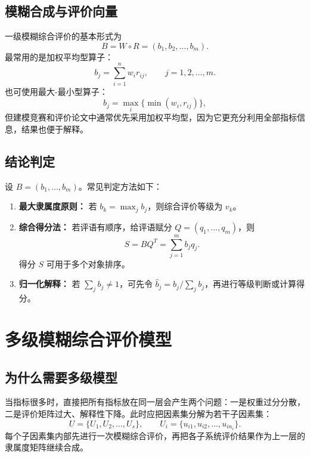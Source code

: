 \documentclass[UTF8,zihao=-4,fontset=none]{ctexart}
\begin{document}
\subsection{模糊合成与评价向量}
一级模糊综合评价的基本形式为
\begin{equation}
  B=W\circ R=(b_1,b_2,\ldots,b_m).
\end{equation}
最常用的是加权平均型算子：
\begin{equation}
  b_j=\sum_{i=1}^n w_i r_{ij},\qquad j=1,2,\ldots,m.
\end{equation}
也可使用最大-最小型算子：
\begin{equation}
  b_j=\max_i\{\min(w_i,r_{ij})\},
\end{equation}
但建模竞赛和评价论文中通常优先采用加权平均型，因为它更充分利用全部指标信息，结果也便于解释。

\subsection{结论判定}
设 $B=(b_1,\ldots,b_m)$。常见判定方法如下：
\begin{enumerate}[leftmargin=2.2em]
  \item \textbf{最大隶属度原则：} 若 $b_k=\max_j b_j$，则综合评价等级为 $v_k$。
  \item \textbf{综合得分法：} 若评语有顺序，给评语赋分 $Q=(q_1,\ldots,q_m)$，则
  \begin{equation}
    S=BQ^T=\sum_{j=1}^m b_j q_j.
  \end{equation}
  得分 $S$ 可用于多个对象排序。
  \item \textbf{归一化解释：} 若 $\sum_j b_j\ne 1$，可先令 $\hat b_j=b_j/\sum_j b_j$，再进行等级判断或计算得分。
\end{enumerate}

\section{多级模糊综合评价模型}
\subsection{为什么需要多级模型}
当指标很多时，直接把所有指标放在同一层会产生两个问题：一是权重过分分散，二是评价矩阵过大、解释性下降。此时应把因素集分解为若干子因素集：
\begin{equation}
  U=\{U_1,U_2,\ldots,U_s\}, \qquad
  U_i=\{u_{i1},u_{i2},\ldots,u_{in_i}\}.
\end{equation}
每个子因素集内部先进行一次模糊综合评价，再把各子系统评价结果作为上一层的隶属度矩阵继续合成。
\end{document}

